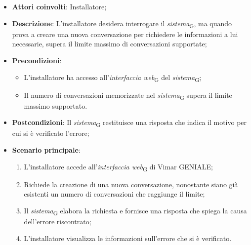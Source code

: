 \begin{itemize}
    \item \textbf{Attori coinvolti}: Installatore;
    \item \textbf{Descrizione}: L’installatore desidera interrogare il \textit{sistema}\textsubscript{G}, ma quando prova a creare una nuova conversazione per richiedere le informazioni a lui necessarie, supera il limite massimo di conversazioni supportate;
    \item \textbf{Precondizioni}: 
    \begin{itemize}
        \item L’installatore ha accesso all’\textit{interfaccia web}\textsubscript{G} del \textit{sistema}\textsubscript{G};
        \item Il numero di conversazioni memorizzate nel \textit{sistema}\textsubscript{G} supera il limite massimo supportato.
    \end{itemize}
    \item \textbf{Postcondizioni}:  Il \textit{sistema}\textsubscript{G} restituisce una risposta che indica il motivo per cui si è verificato l’errore;
    \item \textbf{Scenario principale}:
    \begin{enumerate}
        \item L’installatore accede all’\textit{interfaccia web}\textsubscript{G} di Vimar GENIALE;
        \item Richiede la creazione di una nuova conversazione, nonostante siano già esistenti un numero di conversazioni che raggiunge il limite;
        \item Il \textit{sistema}\textsubscript{G} elabora la richiesta e fornisce una risposta che spiega la causa dell'errore riscontrato;
        \item L’installatore visualizza le informazioni sull’errore che si è verificato.
    \end{enumerate}
\end{itemize}



